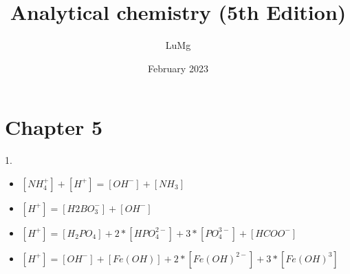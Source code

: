 \documentclass{article}
\title{Analytical chemistry (5th Edition)}
\author{LuMg}
\date{February 2023}
\begin{document}
\maketitle

\section{Chapter 5}
1.
\begin{itemize}
    \item $\left[NH_4^+\right]+\left[H^+\right] = \left[OH^-\right] + \left[NH_3\right]$\\
    \item $\left[H^+\right]=\left[H2BO_3^-\right] +\left[OH^-\right]$\\
    \item $\left[H^+\right] = \left[H_2PO_4\right] + 2*\left[HPO_4^{2-}\right] +3*\left[PO_4^{3-}\right] + \left[HCOO^-\right]$\\
    \item $\left[H^+\right] = \left[OH^-\right] + \left[Fe\left(OH\right)\right] + 2*\left[Fe\left(OH\right)^{2-}\right] + 3*\left[Fe\left(OH\right)^3\right]$
\end{itemize}
\end{document}
